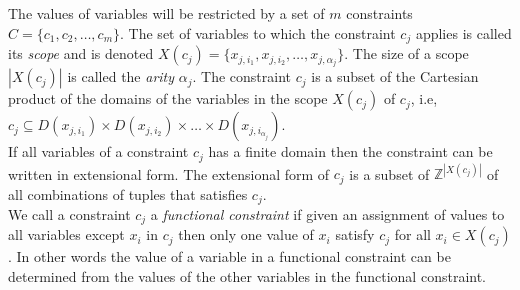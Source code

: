 The values of variables will be restricted by a set of $m$ constraints $C= \{ c_1,c_2, \dots , c_m \} $. The set of 
variables to which the constraint $c_j$ applies is called its \emph{scope} and is denoted $X(c_j) = \{x_{j,{i_1}}, 
x_{j,i_2} , \dots , x_{j,\alpha_j}\}$. The size of a scope $|X(c_j)|$ is called the \emph{arity} $\alpha_j$. The 
constraint $c_j$ is a subset of the Cartesian product of the domains of the variables in the scope $X(c_j)$ of $c_j$, 
i.e, $c_j \subseteq D(x_{j,i_1}) \times D(x_{j,i_2}) \times \dots \times D(x_{j,i_{\alpha_j}})$. \\ 
If all variables of a constraint $c_j$ has a finite domain then the constraint can be written in extensional form. The 
extensional form of $c_j$ is a subset of $\mathbb{Z}^{|X(c_j)|}$ of all combinations of 
tuples that satisfies $c_j$. \\ 
We call a constraint $c_j$ a \emph{functional constraint} if given an assignment of values to all variables except 
$x_i$ in $c_j$ then only one value of $x_i$ satisfy $c_j$ for all $x_i \in X(c_j)$. In other words the value of a 
variable in a functional constraint can be determined from the values of the other variables in the functional 
constraint. 

\iffalse

